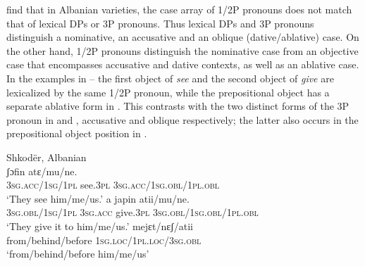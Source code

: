 \documentclass[output=paper,colorlinks,citecolor=brown,modfonts,nonflat]{langsci/langscibook}
\begin{document}
\citet{ManziniSavoia2014} find that in Albanian varieties, the case array of 1/2P pronouns does not match that of lexical DPs or 3P pronouns. Thus lexical DPs and 3P pronouns distinguish a nominative, an accusative and an oblique (dative/ablative) case. On the other hand, 1/2P pronouns distinguish the nominative case from an objective case that encompasses accusative and dative contexts, as well as an ablative case. In the examples in -- the first object of \textit{see} and the second object of \textit{give} are lexicalized by the same 1/2P pronoun, while the prepositional object has a separate ablative form in . This contrasts with the two distinct forms of the 3P pronoun in  and , accusative and oblique respectively; the latter also occurs in the prepositional object position in .

\largerpage[2]

\ea%
    \label{ex:manzini:10}
    Shkodër, Albanian \citep{ManziniSavoia2014}\\
    \ea\label{ex:manzini:10a}
          {ʃɔfin}    {atɛ/mu/ne}.\\
        \textsc{3sg.acc/1sg/1pl}    see.\textsc{3pl} \textsc{3sg.acc/1sg.obl/1pl.obl}\\
    \glt ‘They see him/me/us.’
    \ex\label{ex:manzini:10b}
           {a}   {japin}    {atii/mu/ne}.\\
        \textsc{3sg.obl/1sg/1pl} \textsc{3sg.acc} give.\textsc{3pl}  \textsc{3sg.obl/1sg.obl/1pl.obl}\\
    \glt ‘They give it to him/me/us.’
    \ex\label{ex:manzini:10c}
         {mejɛt/nɛʃ/atii}\\
        from/behind/before \textsc{1sg.loc/1pl.loc/3sg.obl}\\
    \glt ‘from/behind/before him/me/us’
    \z
\z
\end{document}
